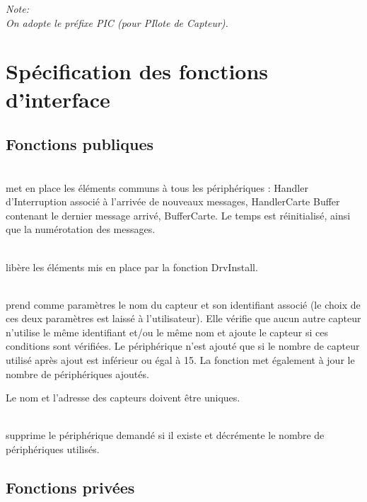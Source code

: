 
\textsl{
Note:\\
On adopte le préfixe PIC (pour PIlote de Capteur).
}

\section{Spécification des fonctions d'interface}

\subsection{Fonctions publiques}

\begin{m_desc}

 \item [PIC\_DrvInstall] \hfill\\
 met en place les éléments communs à tous les périphériques :
Handler d'Interruption associé à l'arrivée de nouveaux messages, HandlerCarte
Buffer contenant le dernier message arrivé, BufferCarte.
Le temps est réinitialisé, ainsi que la numérotation des messages.

 \item [PIC\_DrvRemove] \hfill\\
libère les éléments mis en place par la fonction DrvInstall.

 \item [PIC\_DevAdd] \hfill\\
 prend comme paramètres le nom du capteur et son identifiant associé (le choix de ces deux paramètres est laissé à l'utilisateur). Elle vérifie que aucun autre capteur n'utilise le même identifiant et/ou le même nom et ajoute le capteur si ces conditions sont vérifiées.
Le périphérique n'est ajouté que si le nombre de capteur utilisé après ajout est inférieur ou égal à 15. La fonction met également à jour le nombre de périphériques ajoutés.

Le nom et l'adresse des capteurs doivent être uniques.

 \item [PIC\_DevDelete] \hfill\\
supprime le périphérique demandé si il existe et décrémente le nombre de périphériques utilisés.

\end{m_desc}

\subsection{Fonctions privées}

